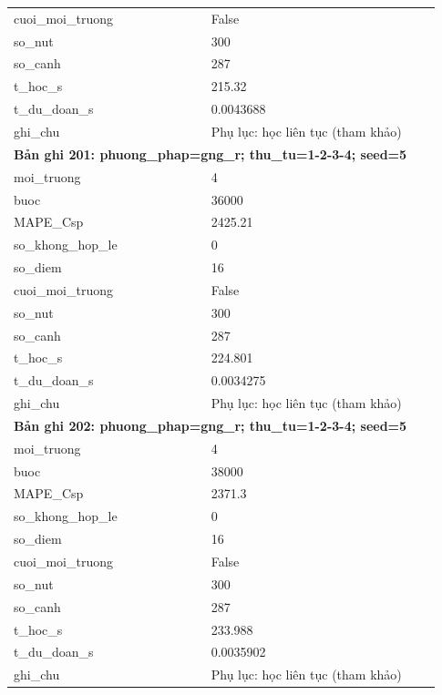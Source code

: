 \begin{longtable}{p{0.43\linewidth}p{0.50\linewidth}}
cuoi\_\allowbreak moi\_\allowbreak truong & False \\
so\_\allowbreak nut & 300 \\
so\_\allowbreak canh & 287 \\
t\_\allowbreak hoc\_\allowbreak s & 215.32 \\
t\_\allowbreak du\_\allowbreak doan\_\allowbreak s & 0.0043688 \\
ghi\_\allowbreak chu & Phụ lục: học liên tục (tham khảo) \\
\midrule
\multicolumn{2}{p{0.95\linewidth}}{\textbf{Bản ghi 201: phuong\_phap=gng\_r; thu\_tu=1-2-3-4; seed=5}} \\
moi\_\allowbreak truong & 4 \\
buoc & 36000 \\
MAPE\_\allowbreak Csp & 2425.21 \\
so\_\allowbreak khong\_\allowbreak hop\_\allowbreak le & 0 \\
so\_\allowbreak diem & 16 \\
cuoi\_\allowbreak moi\_\allowbreak truong & False \\
so\_\allowbreak nut & 300 \\
so\_\allowbreak canh & 287 \\
t\_\allowbreak hoc\_\allowbreak s & 224.801 \\
t\_\allowbreak du\_\allowbreak doan\_\allowbreak s & 0.0034275 \\
ghi\_\allowbreak chu & Phụ lục: học liên tục (tham khảo) \\
\midrule
\multicolumn{2}{p{0.95\linewidth}}{\textbf{Bản ghi 202: phuong\_phap=gng\_r; thu\_tu=1-2-3-4; seed=5}} \\
moi\_\allowbreak truong & 4 \\
buoc & 38000 \\
MAPE\_\allowbreak Csp & 2371.3 \\
so\_\allowbreak khong\_\allowbreak hop\_\allowbreak le & 0 \\
so\_\allowbreak diem & 16 \\
cuoi\_\allowbreak moi\_\allowbreak truong & False \\
so\_\allowbreak nut & 300 \\
so\_\allowbreak canh & 287 \\
t\_\allowbreak hoc\_\allowbreak s & 233.988 \\
t\_\allowbreak du\_\allowbreak doan\_\allowbreak s & 0.0035902 \\
ghi\_\allowbreak chu & Phụ lục: học liên tục (tham khảo) \\

\end{longtable}
